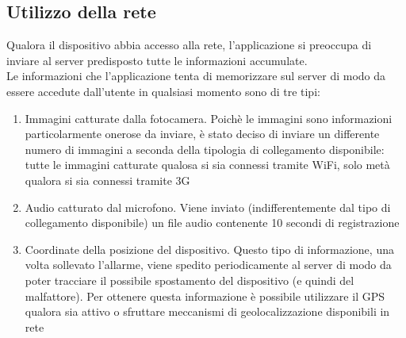 \subsection{Utilizzo della rete}
Qualora il dispositivo abbia accesso alla rete, l'applicazione si preoccupa di inviare al server predisposto tutte le informazioni accumulate.\\
Le informazioni che l'applicazione tenta di memorizzare sul server di modo da essere accedute dall'utente in qualsiasi momento sono di tre tipi:
\begin{enumerate}
  \item Immagini catturate dalla fotocamera. Poichè le immagini sono informazioni particolarmente onerose da inviare, è stato deciso di inviare un differente numero di immagini a seconda della tipologia di collegamento disponibile: tutte le immagini catturate qualosa si sia connessi tramite WiFi, solo metà qualora si sia connessi tramite 3G
  \item Audio catturato dal microfono. Viene inviato (indifferentemente dal tipo di collegamento disponibile) un file audio contenente 10 secondi di registrazione
  \item Coordinate della posizione del dispositivo. Questo tipo di informazione, una volta sollevato l'allarme, viene spedito periodicamente al server di modo da poter tracciare il possibile spostamento del dispositivo (e quindi del malfattore). Per ottenere questa informazione è possibile utilizzare il GPS qualora sia attivo o sfruttare meccanismi di geolocalizzazione disponibili in rete
\end{enumerate}

